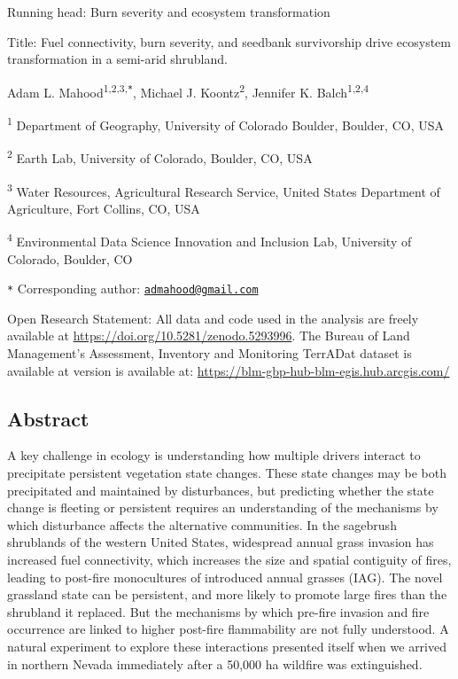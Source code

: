 \documentclass[
  12pt,
]{article}
\author{}
\date{\vspace{-2.5em}}
\begin{document}

Running head: Burn severity and ecosystem transformation

Title: Fuel connectivity, burn severity, and seedbank survivorship drive
ecosystem transformation in a semi-arid shrubland.

Adam L. Mahood\textsuperscript{1,2,3,\texttt{*}}, Michael J.
Koontz\textsuperscript{2}, Jennifer K. Balch\textsuperscript{1,2,4}

\small

\textsuperscript{1} Department of Geography, University of Colorado
Boulder, Boulder, CO, USA

\textsuperscript{2} Earth Lab, University of Colorado, Boulder, CO, USA

\textsuperscript{3} Water Resources, Agricultural Research Service,
United States Department of Agriculture, Fort Collins, CO, USA

\textsuperscript{4} Environmental Data Science Innovation and Inclusion
Lab, University of Colorado, Boulder, CO

\texttt{*} Corresponding author:
\href{mailto:admahood@gmail.com}{\nolinkurl{admahood@gmail.com}}

\normalsize

Open Research Statement: All data and code used in the analysis are
freely available at \url{https://doi.org/10.5281/zenodo.5293996}. The
Bureau of Land Management's Assessment, Inventory and Monitoring
TerrADat dataset is available at version is available at:
\url{https://blm-gbp-hub-blm-egis.hub.arcgis.com/}

\newpage

\linenumbers

\hypertarget{abstract}{%
\subsection{Abstract}\label{abstract}}

A key challenge in ecology is understanding how multiple drivers
interact to precipitate persistent vegetation state changes. These state
changes may be both precipitated and maintained by disturbances, but
predicting whether the state change is fleeting or persistent requires
an understanding of the mechanisms by which disturbance affects the
alternative communities. In the sagebrush shrublands of the western
United States, widespread annual grass invasion has increased fuel
connectivity, which increases the size and spatial contiguity of fires,
leading to post-fire monocultures of introduced annual grasses (IAG).
The novel grassland state can be persistent, and more likely to promote
large fires than the shrubland it replaced. But the mechanisms by which
pre-fire invasion and fire occurrence are linked to higher post-fire
flammability are not fully understood. A natural experiment to explore
these interactions presented itself when we arrived in northern Nevada
immediately after a 50,000 ha wildfire was extinguished.
\end{document}
